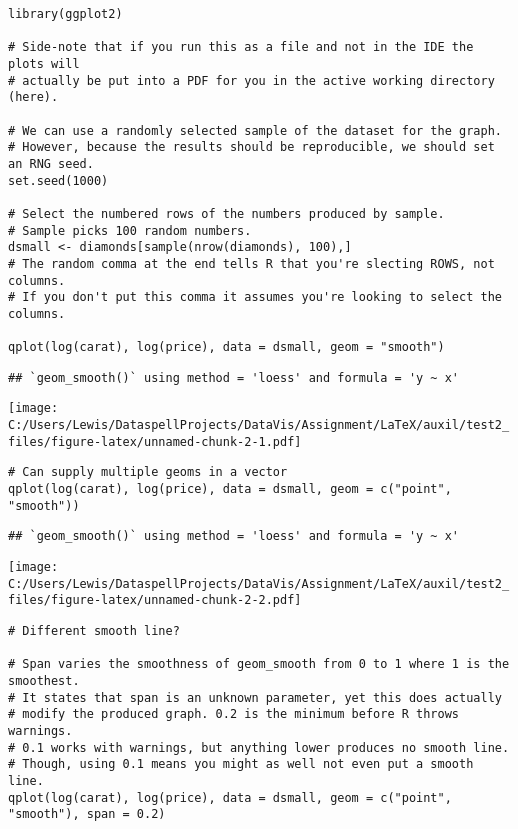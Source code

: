 \begin{verbatim}
library(ggplot2)

# Side-note that if you run this as a file and not in the IDE the plots will
# actually be put into a PDF for you in the active working directory (here).

# We can use a randomly selected sample of the dataset for the graph.
# However, because the results should be reproducible, we should set an RNG seed.
set.seed(1000)

# Select the numbered rows of the numbers produced by sample.
# Sample picks 100 random numbers.
dsmall <- diamonds[sample(nrow(diamonds), 100),]
# The random comma at the end tells R that you're slecting ROWS, not columns.
# If you don't put this comma it assumes you're looking to select the columns.

qplot(log(carat), log(price), data = dsmall, geom = "smooth")
\end{verbatim}

\begin{verbatim}
## `geom_smooth()` using method = 'loess' and formula = 'y ~ x'
\end{verbatim}

\texttt{[image: C:/Users/Lewis/DataspellProjects/DataVis/Assignment/LaTeX/auxil/test2\_files/figure-latex/unnamed-chunk-2-1.pdf]}

\begin{verbatim}
# Can supply multiple geoms in a vector
qplot(log(carat), log(price), data = dsmall, geom = c("point", "smooth"))
\end{verbatim}

\begin{verbatim}
## `geom_smooth()` using method = 'loess' and formula = 'y ~ x'
\end{verbatim}

\texttt{[image: C:/Users/Lewis/DataspellProjects/DataVis/Assignment/LaTeX/auxil/test2\_files/figure-latex/unnamed-chunk-2-2.pdf]}

\begin{verbatim}
# Different smooth line?

# Span varies the smoothness of geom_smooth from 0 to 1 where 1 is the smoothest.
# It states that span is an unknown parameter, yet this does actually
# modify the produced graph. 0.2 is the minimum before R throws warnings.
# 0.1 works with warnings, but anything lower produces no smooth line.
# Though, using 0.1 means you might as well not even put a smooth line.
qplot(log(carat), log(price), data = dsmall, geom = c("point", "smooth"), span = 0.2)
\end{verbatim}

